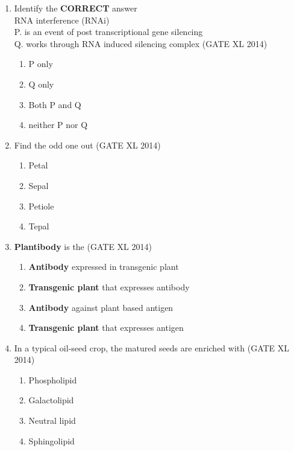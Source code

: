 \documentclass[journal,12pt,onecolumn]{IEEEtran}
\theoremstyle{remark}
\begin{document}
\begin{enumerate}
\item Identify the \textbf{CORRECT} answer\\
RNA interference (RNAi) \\
P. is an event of post transcriptional gene silencing\\
Q. works through RNA induced silencing complex \hfill(GATE XL 2014)\\
\begin{multicols}{2}
\begin{enumerate}
\item P only
\item Q only
\item Both P and Q
\item neither P nor Q
\end{enumerate}
\end{multicols}

\item Find the odd one out \hfill(GATE XL 2014)\\
\begin{multicols}{2}
\begin{enumerate}
\item Petal
\item Sepal
\item Petiole
\item Tepal
\end{enumerate}
\end{multicols}

\item \textbf{Plantibody} is the \hfill(GATE XL 2014)\\
\begin{multicols}{2}
\begin{enumerate}
\item \textbf{Antibody} expressed in transgenic plant
\item \textbf{Transgenic plant} that expresses antibody
\item \textbf{Antibody} against plant based antigen
\item \textbf{Transgenic plant} that expresses antigen
\end{enumerate}
\end{multicols}

\item In a typical oil-seed crop, the matured seeds are enriched with \hfill(GATE XL 2014)\\
\begin{multicols}{2}
\begin{enumerate}
\item Phospholipid
\item Galactolipid
\item Neutral lipid
\item Sphingolipid
\end{enumerate}
\end{multicols}


\end{enumerate}
\end{document}
